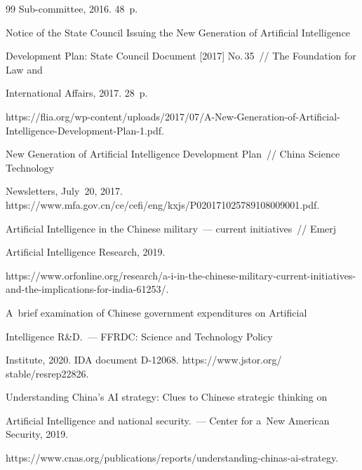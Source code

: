 {{\begin{thebibliography}{99}
Sub-committee, 2016. 48~p.




Notice of the State Council Issuing the New Generation of Artificial Intelligence 


Development Plan: State Council Document [2017] No.\,35~/\!\!/ The Foundation for Law and 


International Affairs, 2017. 28~p. 


{\sf https://flia.org/wp-content/uploads/2017/07/A-New-Generation-of-Artificial-Intelligence-Development-Plan-1.pdf}.




New Generation of Artificial Intelligence Development Plan~/\!\!/ China Science  Technology 


Newsletters, July~20, 2017. {\sf https://www.mfa.gov.cn/ce/cefi/eng/kxjs/\linebreak P020171025789108009001.pdf}.




 Artificial Intelligence in the Chinese military~--- current initiatives~/\!\!/ Emerj 


Artificial Intelligence Research, 2019.


{\sf  https://www.orfonline.org/research/\linebreak a-i-in-the-chinese-military-current-initiatives-and-the-implications-for-india-61253/}.






 A~brief examination of Chinese government expenditures on Artificial 


Intelligence R\&D.~--- FFRDC: Science and Technology Policy 


Institute, 2020.  IDA document D-12068. {\sf https://www.jstor.org/ stable/resrep22826}. 




 Understanding China's AI strategy: Clues to Chinese strategic thinking on 


Artificial Intelligence and national security.~--- Center for a~New American Security, 2019.


 {\sf https://www.cnas.org/publications/reports/understanding-chinas-ai-strategy}.


 





\end{thebibliography}}}
